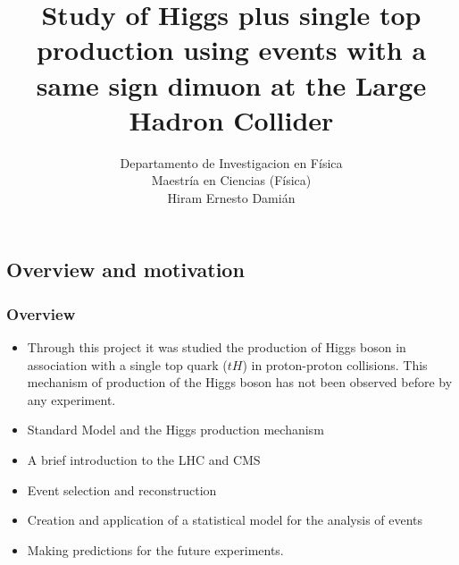 \documentclass[11pt]{beamer}
\begin{document}
	\author{Departamento de Investigacion en F\'isica \\
		Maestr\'ia en Ciencias (F\'isica)\\
		Hiram Ernesto Dami\'an}
	\title{Study of Higgs plus single top production using events with a same sign dimuon  at the Large Hadron Collider}
	\newcommand{\nologo}{\setbeamertemplate{logo}{}}
	\newcommand{\subf}[2]{%
		{\small\begin{tabular}[t]{@{}c@{}}
				#1\\#2
		\end{tabular}}%
	}
\begin{frame}
\titlepage
\end{frame}

\begin{frame}
\tableofcontents
\end{frame}


\begin{frame}
\section{Overview and motivation}
\frametitle{Overview}
\begin{itemize}
\item Through this project it was studied the production of Higgs boson in association with a
single top quark ($tH$) in proton-proton collisions. 
This mechanism of production of the Higgs boson has not been observed before by any
experiment.
\item Standard Model and the Higgs production mechanism
\item A brief introduction to the LHC and CMS
\item Event selection and reconstruction
\item Creation and application of a statistical model for the analysis of events 
\item Making predictions for the future experiments.
\end{itemize}
\end{frame}
\end{document}
